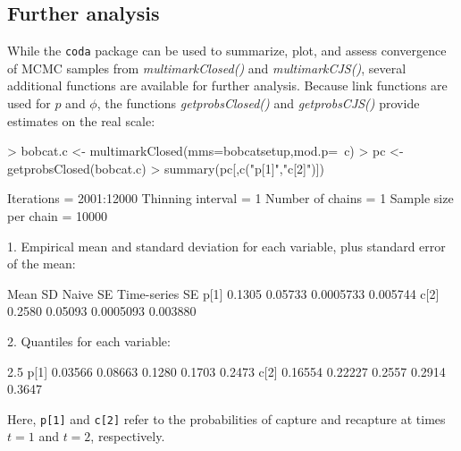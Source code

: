 \documentclass[12pt]{article}
\begin{document}
\subsection{Further analysis}
While the \verb|coda| package can be used to summarize, plot, and assess convergence of MCMC samples from \textit{multimarkClosed()} and \textit{multimarkCJS()}, several additional functions are available for further analysis. Because link functions are used for $p$ and $\phi$, the functions \textit{getprobsClosed()} and \textit{getprobsCJS()} provide estimates on the real scale:
\begin{Schunk}
\begin{Sinput}
> bobcat.c <- multimarkClosed(mms=bobcatsetup,mod.p=~c)
> pc <- getprobsClosed(bobcat.c)
> summary(pc[,c("p[1]","c[2]")])
\end{Sinput}
\end{Schunk}
\begin{Schunk}
\begin{Soutput}
Iterations = 2001:12000
Thinning interval = 1 
Number of chains = 1 
Sample size per chain = 10000 

1. Empirical mean and standard deviation for each variable,
   plus standard error of the mean:

       Mean      SD  Naive SE Time-series SE
p[1] 0.1305 0.05733 0.0005733       0.005744
c[2] 0.2580 0.05093 0.0005093       0.003880

2. Quantiles for each variable:

        2.5%
p[1] 0.03566 0.08663 0.1280 0.1703 0.2473
c[2] 0.16554 0.22227 0.2557 0.2914 0.3647
\end{Soutput}
\end{Schunk}
Here, \verb|p[1]| and \verb|c[2]| refer to the probabilities of capture and recapture at times $t=1$ and $t=2$, respectively.
\end{document}
